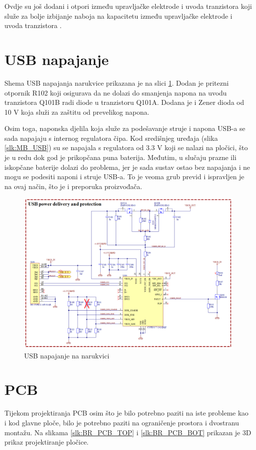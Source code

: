 Ovdje su još dodani i otpori između upravljačke elektrode i uvoda tranzistora koji služe za bolje izbijanje naboja na kapacitetu između upravljačke elektrode i uvoda tranzistora \cite{ti:bq29700}.

\section{USB napajanje}
\label{sec:BR_USB}
Shema USB napajanja narukvice prikazana je na slici \ref{slk:BR_USB}. Dodan je pritezni otpornik R102 koji osigurava da ne dolazi do smanjenja napona na uvodu tranzistora Q101B radi diode u tranzistoru Q101A. Dodana je i Zener dioda od 10 V koja služi za zaštitu od prevelikog napona.

Osim toga, naponska djelila koja služe za podešavanje struje i napona USB-a se sada napajaju s internog regulatora čipa. Kod središnjeg uređaja (slika \ref{slk:MB_USB}) su se napajala s regulatora od 3.3 V koji se nalazi na pločici, što je u redu dok god je prikopčana puna baterija. Međutim, u slučaju prazne ili iskopčane baterije dolazi do problema, jer je sada sustav ostao bez napajanja i ne mogu se podesiti naponi i struje USB-a. To je veoma grub previd i ispravljen je na ovaj način, što je i preporuka proizvođača.
\begin{figure}[htb]
    \centering
    \includegraphics[width=\textwidth]{Figures/BR_USB.png}
    \caption{USB napajanje na narukvici}
    \label{slk:BR_USB}
\end{figure}
\section{PCB}
Tijekom projektiranja PCB osim što je bilo potrebno paziti na iste probleme kao i kod glavne ploče, bilo je potrebno paziti na ograničenje prostora i dvostranu montažu. Na slikama \ref{slk:BR_PCB_TOP} i \ref{slk:BR_PCB_BOT} prikazan je 3D prikaz projektiranje pločice.

